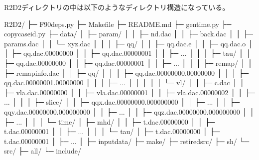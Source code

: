\documentclass[letterpaper,10pt,dvipdfmx,report]{sphinxmanual}
\begin{document}
\sphinxAtStartPar
R2D2ディレクトリの中は以下のようなディレクトリ構造になっている。

\begin{sphinxVerbatim}[commandchars=\\\{\}]
R2D2/
   ├─ F90\PYGZus{}deps.py
   ├─ Makefile
   ├─ README.md
   ├─ gen\PYGZus{}time.py
   ├─ copy\PYGZus{}caseid.py
   ├─ data/
   │     ├─ param/
   │     │      ├─ nd.dac
   │     │      ├─ back.dac
   │     │      ├─ params.dac
   │     │      └─ xyz.dac
   │     │
   │     ├─ qq/
   │     │   ├─ qq.dac.e
   │     │   ├─ qq.dac.o
   │     │   ├─ qq.dac.00000000
   │     │   ├─ qq.dac.00000001
   │     │   ├─ ...
   │     │
   │     ├─ tau/
   │     │   ├─ qq.dac.00000000
   │     │   ├─ qq.dac.00000001
   │     │   ├─ ...
   │     │
   │     ├─ remap/
   │     │      ├─ remap\PYGZus{}info.dac
   │     │      ├─ qq/
   │     │      │   ├─ qq.dac.00000000.00000000
   │     │      │   ├─ qq.dac.00000001.00000000
   │     │      │   ├─ ...
   │     │      │
   │     │      └─ vl/
   │     │          ├─ c.dac
   │     │          ├─ vla.dac.00000000
   │     │          ├─ vla.dac.00000001
   │     │          ├─ vla.dac.00000002
   │     │          ├─ ...
   │     │
   │     ├─ slice/
   │     │   ├─ qqx.dac.00000000.000000000
   │     │   ├─ ...
   │     │   ├─ qqy.dac.00000000.000000000
   │     │   ├─ ...
   │     │   ├─ qqz.dac.00000000.000000000
   │     │   ├─ ...
   │     │
   │     └─ time/
   │           ├─ mhd/
   │           │    ├─ t.dac.00000000
   │           │    ├─ t.dac.00000001
   │           │    ├─ ...
   │           │
   │           └─ tau/
   │                ├─ t.dac.00000000
   │                ├─ t.dac.00000001
   │                ├─ ...
   │
   ├─ input\PYGZus{}data/
   ├─ make/
   ├─ retired\PYGZus{}src/
   ├─ sh/
   └─ src/
        ├─ all/
        └─ include/
\end{sphinxVerbatim}
\end{document}
